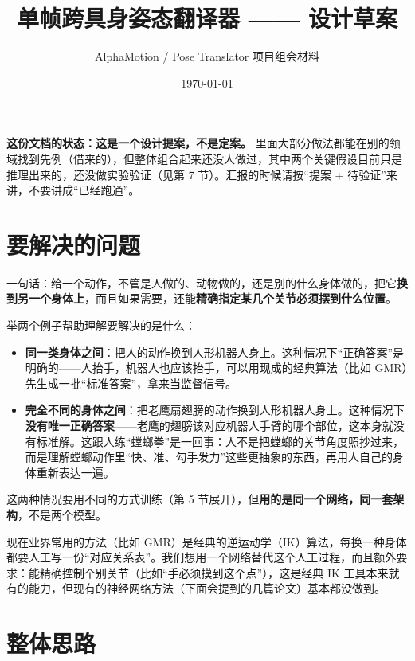 \documentclass[11pt,a4paper]{ctexart}
\title{\bfseries 单帧跨具身姿态翻译器 —— 设计草案}
\author{AlphaMotion / Pose Translator 项目组会材料}
\date{\today}
\begin{document}
\maketitle

\begin{statusbox}
\textbf{这份文档的状态：这是一个设计提案，不是定案。}
里面大部分做法都能在别的领域找到先例（借来的），但整体组合起来还没人做过，其中两个关键假设目前只是推理出来的，还没做实验验证（见第 7 节）。汇报的时候请按“提案 + 待验证”来讲，不要讲成“已经跑通”。
\end{statusbox}

\section{要解决的问题}

一句话：给一个动作，不管是人做的、动物做的，还是别的什么身体做的，把它\textbf{换到另一个身体上}，而且如果需要，还能\textbf{精确指定某几个关节必须摆到什么位置}。

举两个例子帮助理解要解决的是什么：

\begin{itemize}
    \item \textbf{同一类身体之间}：把人的动作换到人形机器人身上。这种情况下“正确答案”是明确的——人抬手，机器人也应该抬手，可以用现成的经典算法（比如 GMR）先生成一批“标准答案”，拿来当监督信号。
    \item \textbf{完全不同的身体之间}：把老鹰扇翅膀的动作换到人形机器人身上。这种情况下\textbf{没有唯一正确答案}——老鹰的翅膀该对应机器人手臂的哪个部位，这本身就没有标准解。这跟人练“螳螂拳”是一回事：人不是把螳螂的关节角度照抄过来，而是理解螳螂动作里“快、准、勾手发力”这些更抽象的东西，再用人自己的身体重新表达一遍。
\end{itemize}

这两种情况要用不同的方式训练（第 5 节展开），但\textbf{用的是同一个网络，同一套架构}，不是两个模型。

现在业界常用的方法（比如 GMR）是经典的逆运动学（IK）算法，每换一种身体都要人工写一份“对应关系表”。我们想用一个网络替代这个人工过程，而且额外要求：能精确控制个别关节（比如“手必须摸到这个点”），这是经典 IK 工具本来就有的能力，但现有的神经网络方法（下面会提到的几篇论文）基本都没做到。

\section{整体思路}
\end{document}
